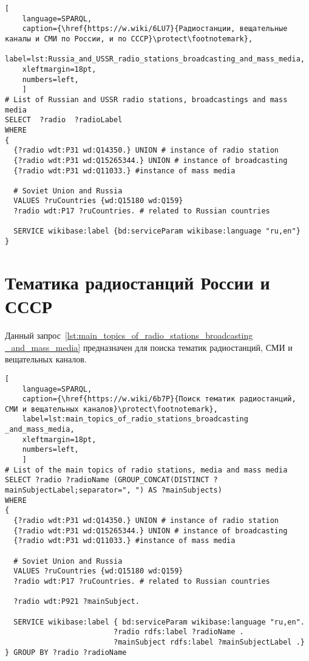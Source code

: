 \begin{lstlisting}[ 
    language=SPARQL,
    caption={\href{https://w.wiki/6LU7}{Радиостанции, вещательные каналы и СМИ по России, и по СССР}\protect\footnotemark},
    label=lst:Russia_and_USSR_radio_stations_broadcasting_and_mass_media,
    xleftmargin=18pt,
    numbers=left,
    ]
# List of Russian and USSR radio stations, broadcastings and mass media
SELECT  ?radio  ?radioLabel
WHERE
{
  {?radio wdt:P31 wd:Q14350.} UNION # instance of radio station
  {?radio wdt:P31 wd:Q15265344.} UNION # instance of broadcasting
  {?radio wdt:P31 wd:Q11033.} #instance of mass media
  
  # Soviet Union and Russia
  VALUES ?ruCountries {wd:Q15180 wd:Q159}
  ?radio wdt:P17 ?ruCountries. # related to Russian countries
  
  SERVICE wikibase:label {bd:serviceParam wikibase:language "ru,en"}
}\end{lstlisting}%


\newpage

\section{Тематика радиостанций России и СССР}

Данный запрос~\ref{lst:main_topics_of_radio_stations_broadcasting _and_mass_media} предназначен для поиска тематик радиостанций, СМИ и вещательных каналов.

\begin{lstlisting}[ 
    language=SPARQL,
    caption={\href{https://w.wiki/6b7P}{Поиск тематик радиостанций, СМИ и вещательных каналов}\protect\footnotemark},
    label=lst:main_topics_of_radio_stations_broadcasting _and_mass_media,
    xleftmargin=18pt,
    numbers=left,
    ]
# List of the main topics of radio stations, media and mass media
SELECT ?radio ?radioName (GROUP_CONCAT(DISTINCT ?mainSubjectLabel;separator=", ") AS ?mainSubjects) 
WHERE
{
  {?radio wdt:P31 wd:Q14350.} UNION # instance of radio station
  {?radio wdt:P31 wd:Q15265344.} UNION # instance of broadcasting
  {?radio wdt:P31 wd:Q11033.} #instance of mass media
  
  # Soviet Union and Russia
  VALUES ?ruCountries {wd:Q15180 wd:Q159}
  ?radio wdt:P17 ?ruCountries. # related to Russian countries
  
  ?radio wdt:P921 ?mainSubject.
  
  SERVICE wikibase:label { bd:serviceParam wikibase:language "ru,en".
                         ?radio rdfs:label ?radioName .
                         ?mainSubject rdfs:label ?mainSubjectLabel .}
} GROUP BY ?radio ?radioName\end{lstlisting}%

